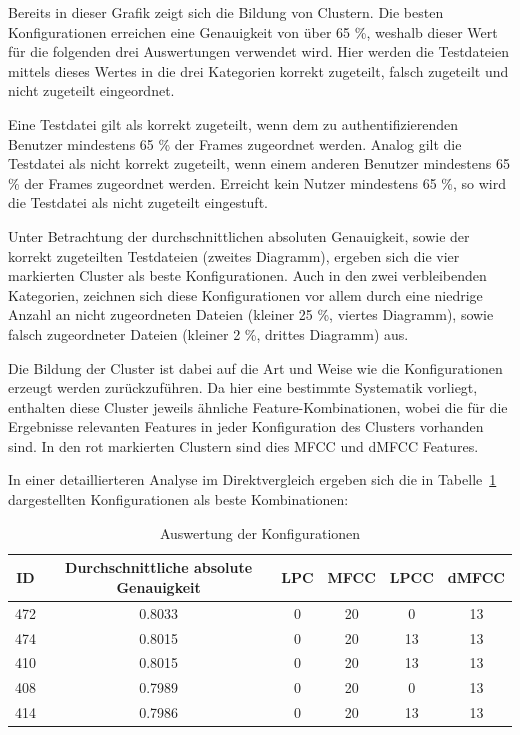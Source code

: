 Bereits in dieser Grafik zeigt sich die Bildung von Clustern.
Die besten Konfigurationen erreichen eine Genauigkeit von über 65 \%, weshalb dieser Wert für die folgenden drei Auswertungen verwendet wird.
Hier werden die Testdateien mittels dieses Wertes in die drei Kategorien korrekt zugeteilt, falsch zugeteilt und nicht zugeteilt eingeordnet.

Eine Testdatei gilt als korrekt zugeteilt, wenn dem zu authentifizierenden Benutzer mindestens 65 \% der Frames zugeordnet werden.
Analog gilt die Testdatei als nicht korrekt zugeteilt, wenn einem anderen Benutzer mindestens 65 \% der Frames zugeordnet werden.
Erreicht kein Nutzer mindestens 65 \%, so wird die Testdatei als nicht zugeteilt eingestuft.

Unter Betrachtung der durchschnittlichen absoluten Genauigkeit, sowie der korrekt zugeteilten Testdateien (zweites Diagramm), ergeben sich die vier markierten Cluster als beste Konfigurationen.
Auch in den zwei verbleibenden Kategorien, zeichnen sich diese Konfigurationen vor allem durch eine niedrige Anzahl an nicht zugeordneten Dateien (kleiner 25 \%, viertes Diagramm), sowie falsch zugeordneter Dateien (kleiner 2 \%, drittes Diagramm) aus.

Die Bildung der Cluster ist dabei auf die Art und Weise wie die Konfigurationen erzeugt werden zurückzuführen.
Da hier eine bestimmte Systematik vorliegt, enthalten diese Cluster jeweils ähnliche Feature-Kombinationen, wobei die für die Ergebnisse relevanten Features in jeder Konfiguration des Clusters vorhanden sind.
In den rot markierten Clustern sind dies \ac{MFCC} und \ac{dMFCC} Features.

In einer detaillierteren Analyse im Direktvergleich ergeben sich die in Tabelle~\ref{table:ergebnisOutput} dargestellten Konfigurationen als beste Kombinationen:
\begin{table}[H]
    \centering
    \begin{tabular}{c|c|c|c|c|c}
    ID  & Durchschnittliche absolute Genauigkeit & \ac{LPC} & \ac{MFCC} & \ac{LPCC} & \ac{dMFCC} \\ \hline
    472 &                                 0.8033 &        0 &        20 &         0 &         13 \\ \hline
    474 &                                 0.8015 &        0 &        20 &        13 &         13 \\ \hline
    410 &                                 0.8015 &        0 &        20 &        13 &         13 \\ \hline
    408 &                                 0.7989 &        0 &        20 &         0 &         13 \\ \hline
    414 &                                 0.7986 &        0 &        20 &        13 &         13 \\
    \end{tabular}
    \caption{Auswertung der Konfigurationen}
    \label{table:ergebnisOutput}
\end{table}

